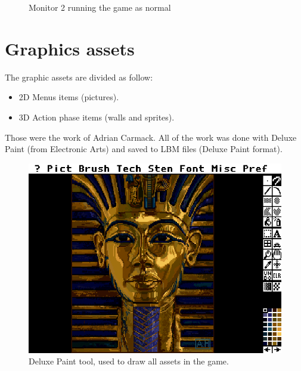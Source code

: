 \documentclass[book.tex]{subfiles}
\begin{document}
\begin{figure}[H]
\centering
\caption{Monitor 2 running the game as normal}
\label{fig:dm1}
\end{figure}



 
 
 




\section{Graphics assets}
The graphic assets are divided as follow:
\begin{itemize}
\item 2D Menus items (pictures).
\item 3D Action phase items (walls and sprites).
\end{itemize}
Those were the work of Adrian Carmack. All of the work was done with Deluxe Paint (from Electronic Arts) and saved to LBM files (Deluxe Paint format). 

\begin{figure}[H]
  \centering
 \includegraphics[width=\textwidth]{screenshots/deluxe_paint.png}
 \caption{Deluxe Paint tool, used to draw all assets in the game.}
\end{figure}
\end{document}

